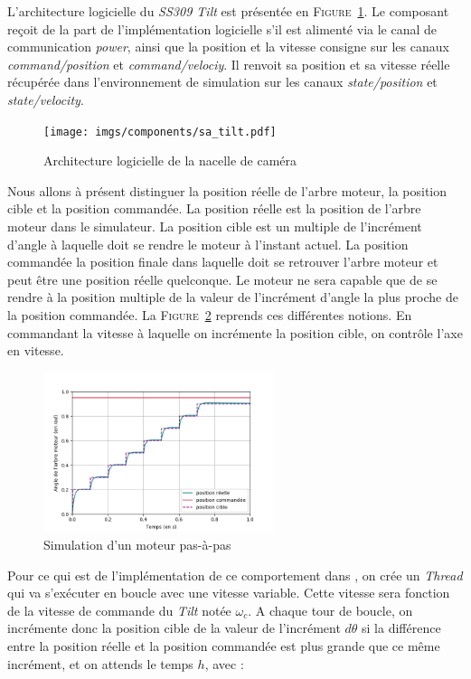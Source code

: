 				L'architecture logicielle du \textit{SS309 Tilt} est présentée en \textsc{Figure}~\ref{fig:sa_tilt}. Le composant reçoit de la part de l'implémentation logicielle s'il est alimenté via le canal de communication \textit{power}, ainsi que la position et la vitesse consigne sur les canaux \textit{command/position} et \textit{command/velociy}. Il renvoit sa position et sa vitesse réelle récupérée dans l'environnement de simulation sur les canaux \textit{state/position} et \textit{state/velocity}.

				\begin{figure}[!htb]
					\centering
					\texttt{[image: imgs/components/sa\_tilt.pdf]}
					\caption{Architecture logicielle de la nacelle de caméra}
					\label{fig:sa_tilt}
				\end{figure}

				Nous allons à présent distinguer la position réelle de l'arbre moteur, la position cible et la position commandée. La position réelle est la position de l'arbre moteur dans le simulateur. La position cible est un multiple de l'incrément d'angle à laquelle doit se rendre le moteur à l'instant actuel. La position commandée la position finale dans laquelle doit se retrouver l'arbre moteur et peut être une position réelle quelconque. Le moteur ne sera capable que de se rendre à la position multiple de la valeur de l'incrément d'angle la plus proche de la position commandée. La \textsc{Figure}~\ref{fig:tilt_position} reprends ces différentes notions. En commandant la vitesse à laquelle on incrémente la position cible, on contrôle l'axe en vitesse.

				\begin{figure}[!htb]
					\centering
					\includegraphics[width=0.6\textwidth]{imgs/stepper_motor.png}
					\caption{Simulation d'un moteur pas-à-pas}
					\label{fig:tilt_position}
				\end{figure}
				
				Pour ce qui est de l'implémentation de ce comportement dans \gazebo{}, on crée un \textit{Thread} qui va s'exécuter en boucle avec une vitesse variable. Cette vitesse sera fonction de la vitesse de commande du \textit{Tilt} notée $\omega_c$. A chaque tour de boucle, on incrémente donc la position cible de la valeur de l'incrément $d\theta$ si la différence entre la position réelle et la position commandée est plus grande que ce même incrément, et on attends le temps $h$, avec :


